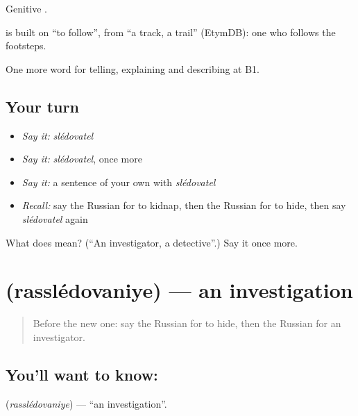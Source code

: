 Genitive \emph{}.

\begin{cousinweb}
\emph{} is built on \emph{} \textquotedblleft{}to follow\textquotedblright{}, from \emph{} \textquotedblleft{}a track, a trail\textquotedblright{} (EtymDB): one who follows the footsteps.
\end{cousinweb}

\begin{grammarlens}[title={What you've built}]
One more word for telling, explaining and describing at B1.
\end{grammarlens}

\subsection*{Your turn}
\begin{itemize}
\raggedright
  \item \emph{Say it:} \emph{slédovatel}
  \item \emph{Say it:} \emph{slédovatel}, once more
  \item \emph{Say it:} a sentence of your own with \emph{slédovatel}
  \item \emph{Recall:} say the Russian for to kidnap, then the Russian for to hide, then say \emph{slédovatel} again
\end{itemize}

\begin{tcolorbox}[breakable,colback=teal!4,colframe=teal!35!black,title={Before you move on}]
What does  mean? (\textquotedblleft{}An investigator, a detective\textquotedblright{}.) Say it once more.
\end{tcolorbox}
\section[\texorpdfstring{\ru{расследование} (rasslédovaniye)}{расследование (rasslédovaniye)}]{ (rasslédovaniye) — an investigation}

\label{lesson:RU-C291-rassledovaniye}



\begin{quote}
Before the new one: say the Russian for to hide, then the Russian for an investigator.
\end{quote}

\subsection*{You'll want to know: }
\textbf{} (\emph{rasslédovaniye}) — \textquotedblleft{}an investigation\textquotedblright{}.

